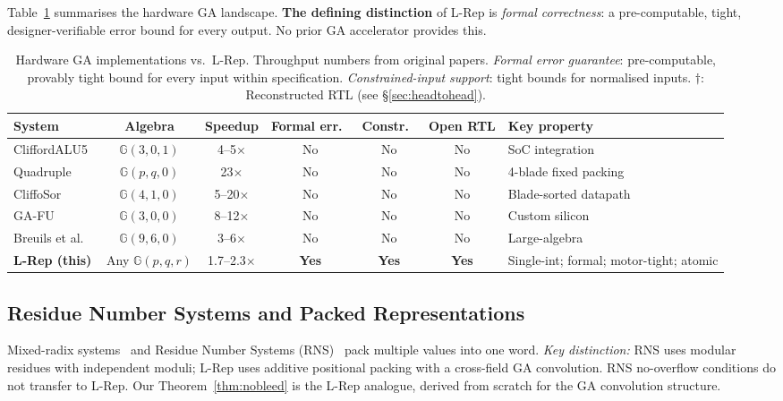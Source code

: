 \documentclass[11pt,a4paper]{article}
\theoremstyle{definition}
\theoremstyle{plain}
\theoremstyle{remark}
\newcommand{\GA}{\mathbb{G}}
\begin{document}
Table~\ref{tab:related-hw} summarises the hardware GA landscape.
\textbf{The defining distinction} of L-Rep is \emph{formal correctness}:
a pre-computable, tight, designer-verifiable error bound for every output.
No prior GA accelerator provides this.

\begin{table}[h]
\centering
\caption{Hardware GA implementations vs.\ L-Rep.
Throughput numbers from original papers.
\emph{Formal error guarantee}: pre-computable, provably tight bound for
every input within specification.
\emph{Constrained-input support}: tight bounds for normalised inputs.
$\dagger$: Reconstructed RTL (see \S\ref{sec:headtohead}).}
\label{tab:related-hw}
\small
\begin{tabular}{lcccccp{2.5cm}}
\toprule
System & Algebra & Speedup & Formal err.\ & Constr.\ & Open RTL & Key property \\
\midrule
CliffordALU5~\cite{cliffordalu5} & $\GA(3,0,1)$ & 4--5$\times$ & No & No & No & SoC integration \\
Quadruple~\cite{quadrupleGA} & $\GA(p,q,0)$ & 23$\times$ & No & No & No & 4-blade fixed packing \\
CliffoSor~\cite{cliffosor} & $\GA(4,1,0)$ & 5--20$\times$ & No & No & No & Blade-sorted datapath \\
GA-FU~\cite{gafu} & $\GA(3,0,0)$ & 8--12$\times$ & No & No & No & Custom silicon \\
Breuils et al.~\cite{breuils2017} & $\GA(9,6,0)$ & 3--6$\times$ & No & No & No & Large-algebra \\
\midrule
\textbf{L-Rep (this)} & Any $\GA(p,q,r)$ & 1.7--2.3$\times$ & \textbf{Yes} & \textbf{Yes} & \textbf{Yes} & Single-int; formal; motor-tight; atomic \\
\bottomrule
\end{tabular}
\end{table}

\subsection{Residue Number Systems and Packed Representations}

Mixed-radix systems~\cite{knuth1998} and Residue Number Systems
(RNS)~\cite{crt_fpga} pack multiple values into one word.
\emph{Key distinction:} RNS uses modular residues with independent moduli;
L-Rep uses additive positional packing with a cross-field GA convolution.
RNS no-overflow conditions do not transfer to L-Rep.
Our Theorem~\ref{thm:nobleed} is the L-Rep analogue, derived from scratch
for the GA convolution structure.
\end{document}
